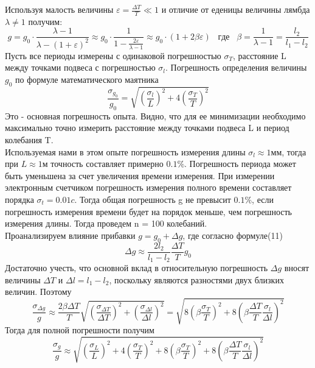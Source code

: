 \documentclass[a4paper, 12pt]{article}
\begin{document}
Используя малость величины $\varepsilon = \frac{\Delta T}{T}\ll 1$ и отличие от еденицы величины лямбда $\lambda\neq 1$ получим:
\begin{equation}
	g = g_0\cdot\frac{\lambda - 1}{\lambda-(1 + \varepsilon)^2}\approx g_0\cdot\frac{1}{1- \frac{2\varepsilon}{\lambda - 1}}\approx g_0\cdot(1 + 2\beta\varepsilon) \hspace{10pt} где\hspace{10pt} \beta= \frac{1}{\lambda -1}=\frac{l_2}{l_1-l_2} 
\end{equation}
Пусть все периоды измерены с одинаковой погрешностью $\sigma_T$, расстояние L между точками подвеса с погрешностью $\sigma_l$. Погрешность определения величины $g_0$ по формуле математического маятника
\begin{equation}
\frac{\sigma_{g_0}}{g_0} = \sqrt{(\frac{\sigma_l}{L})^2 + 4(\frac{\sigma_T}{T})^2}
\end{equation}
Это - основная погрешность опыта. Видно, что для ее минимизации необходимо максимально точно измерить расстояние между точками подвеса L и период колебания T.\\
Используемая нами в этом опыте погрешность измерения длины $\sigma_l\approx 1мм$, тогда при $L\approx1 м$ точность составляет примерно $0.1\%$. Погрешность периода может быть уменьшена за счет увеличения времени измерения. При измерении электронным счетчиком погрешность измерения полного времени составляет порядка $\sigma_t = 0.01c$. Тогда общая погрешность g не превысит $0.1\%$, если погрешность измерения времени будет на порядок меньше, чем погрешность измерения длины. Тогда проведем n = 100 колебаний.\\
Проанализируем влияние прибавки $g = g_0 + \Delta g $, где согласно формуле(11)
$$ \Delta g\approx\frac{2l_2}{l_1 - l_2}\frac{\Delta T}{T}g_0$$
Достаточно учесть, что основной вклад в относительную погрешность $\Delta g$ вносят величины $\Delta T$ и $\Delta l = l_1 - l_2$, поскольку являются разностями двух близких величин. Поэтому
$$ \frac{\sigma_{\Delta g}}{g}\approx\frac{2\beta\Delta T}{T}\sqrt{(\frac{\sigma_{\Delta T}}{\Delta T})^2 + (\frac{\sigma_{\Delta l}}{\Delta l})^2} = \sqrt{8(\beta\frac{\sigma_T}{T})^2 + 8(\beta\frac{\Delta T}{T}\frac{\sigma_l}{\Delta l})^2}$$
Тогда для полной погрешности получим
\begin{equation}
\frac{\sigma_{g}}{g}\approx\sqrt{(\frac{\sigma_L}{L})^2 + 4(\frac{\sigma_T}{T})^2 + 8(\beta\frac{\sigma_T}{T})^2 + 8(\beta\frac{\Delta T}{T}\frac{\sigma_l}{\Delta l})^2}
\end{equation}
  
\end{document}

